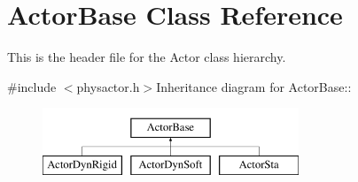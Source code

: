 \hypertarget{classActorBase}{
\section{ActorBase Class Reference}
\label{dd/d7b/classActorBase}
}


This is the header file for the Actor class hierarchy.  


{\ttfamily \#include $<$physactor.h$>$}Inheritance diagram for ActorBase::\begin{figure}[H]
\begin{center}
\leavevmode
\includegraphics[height=2cm]{dd/d7b/classActorBase}
\end{center}
\end{figure}

